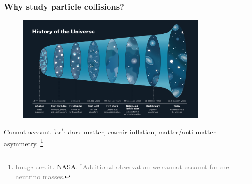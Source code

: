 \documentclass[11pt,xcolor=dvipsnames,aspectratio=169]{beamer}
\newcommand\blfootnote[1]{%
  \begingroup
  \renewcommand\thefootnote{}\footnote{\hspace{-30pt}\textcolor{Gray}{\tiny #1}}%
  \addtocounter{footnote}{-1}%
  \endgroup
}
\begin{document}
\begin{frame}[fragile]
  \frametitle{\bf  Why study particle collisions?}
  \vspace{-5pt}
      \begin{figure}
        \includegraphics[width=0.85\textwidth]{figures/l1/intro/universe_nasa.png}
      \end{figure}
   \vspace{-5pt}   
      Cannot account for{$^*$}: dark matter, cosmic inflation, matter/anti-matter asymmetry. 
%
\blfootnote{Image
  credit: \href{https://universe.nasa.gov/universe/basics/}{NASA}.
  $^*$Additional observation we cannot account for are neutrino masses.}
    \end{frame}
\end{document}
